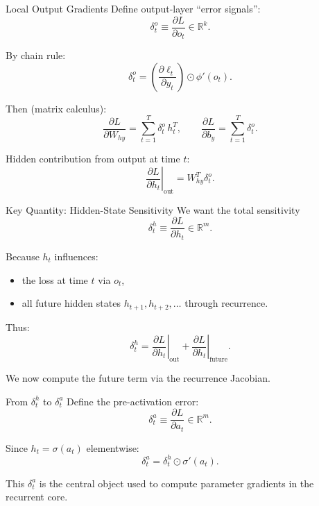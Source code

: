 \documentclass{beamer}
\begin{document}
\begin{frame}{Local Output Gradients}
  Define output-layer ``error signals'':
  \[
  \delta^o_t \equiv \frac{\partial L}{\partial o_t}\in\mathbb{R}^k.
  \]

  By chain rule:
  \[
  \delta^o_t = \left(\frac{\partial \ell_t}{\partial y_t}\right)\odot \phi'(o_t).
  \]

  Then (matrix calculus):
  \[
  \frac{\partial L}{\partial W_{hy}} = \sum_{t=1}^T \delta^o_t\, h_t^T,
  \qquad
  \frac{\partial L}{\partial b_y} = \sum_{t=1}^T \delta^o_t.
  \]

  Hidden contribution from output at time \(t\):
  \[
  \left.\frac{\partial L}{\partial h_t}\right|_{\text{out}}
  =
  W_{hy}^T \delta^o_t.
  \]
\end{frame}

\begin{frame}{Key Quantity: Hidden-State Sensitivity}
  We want the total sensitivity
  \[
  \delta^h_t \equiv \frac{\partial L}{\partial h_t}\in\mathbb{R}^m.
  \]

  Because \(h_t\) influences:
  \begin{itemize}
  \item the loss at time \(t\) via \(o_t\),
  \item all future hidden states \(h_{t+1},h_{t+2},\dots\) through recurrence.
  \end{itemize}

  Thus:
  \[
  \delta^h_t
  =
  \left.\frac{\partial L}{\partial h_t}\right|_{\text{out}}
  +
  \left.\frac{\partial L}{\partial h_t}\right|_{\text{future}}.
  \]

  We now compute the future term via the recurrence Jacobian.
\end{frame}

\begin{frame}{From \(\delta^h_t\) to \(\delta^a_t\)}
  Define the pre-activation error:
  \[
  \delta^a_t \equiv \frac{\partial L}{\partial a_t}\in\mathbb{R}^m.
  \]

  Since \(h_t=\sigma(a_t)\) elementwise:
  \[
  \delta^a_t = \delta^h_t \odot \sigma'(a_t).
  \]

  This \(\delta^a_t\) is the central object used to compute parameter gradients in the recurrent core.
\end{frame}
\end{document}
